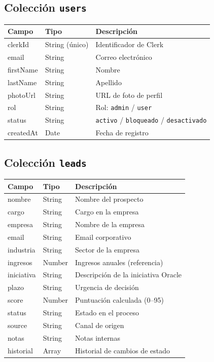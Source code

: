 \documentclass[12pt, a4paper, twoside]{report}
\begin{document}
\subsection*{Colección \texttt{users}}
\begin{center}
\begin{tabular}{L{3cm} L{3.5cm} L{6.5cm}}
  \toprule
  \textbf{Campo} & \textbf{Tipo} & \textbf{Descripción} \\
  \midrule
  clerkId     & String (único) & Identificador de Clerk \\
  email       & String         & Correo electrónico \\
  firstName   & String         & Nombre \\
  lastName    & String         & Apellido \\
  photoUrl    & String         & URL de foto de perfil \\
  rol         & String         & Rol: \texttt{admin} / \texttt{user} \\
  status      & String         & \texttt{activo} / \texttt{bloqueado} / \texttt{desactivado} \\
  createdAt   & Date           & Fecha de registro \\
  \bottomrule
\end{tabular}
\end{center}

\subsection*{Colección \texttt{leads}}
\begin{center}
\begin{tabular}{L{3cm} L{3.5cm} L{6.5cm}}
  \toprule
  \textbf{Campo} & \textbf{Tipo} & \textbf{Descripción} \\
  \midrule
  nombre      & String  & Nombre del prospecto \\
  cargo       & String  & Cargo en la empresa \\
  empresa     & String  & Nombre de la empresa \\
  email       & String  & Email corporativo \\
  industria   & String  & Sector de la empresa \\
  ingresos    & Number  & Ingresos anuales (referencia) \\
  iniciativa  & String  & Descripción de la iniciativa Oracle \\
  plazo       & String  & Urgencia de decisión \\
  score       & Number  & Puntuación calculada (0--95) \\
  status      & String  & Estado en el proceso \\
  source      & String  & Canal de origen \\
  notas       & String  & Notas internas \\
  historial   & Array   & Historial de cambios de estado \\
  \bottomrule
\end{tabular}
\end{center}
\end{document}
